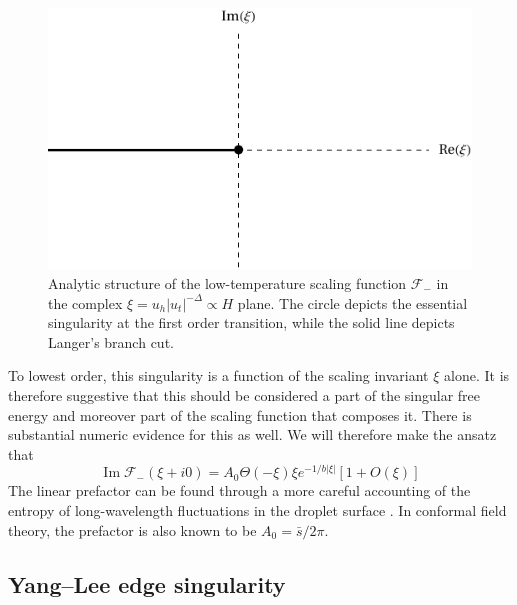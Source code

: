 \documentclass[
aps,
pre,
preprint,
longbibliography,
floatfix
]{revtex4-2}
\begin{document}
\begin{figure}
  \includegraphics{figs/F_lower_singularities.pdf}
  \caption{
    Analytic structure of the low-temperature scaling function $\mathcal F_-$
    in the complex $\xi=u_h|u_t|^{-\Delta}\propto H$ plane. The circle
    depicts the essential singularity at the first order transition, while the
    solid line depicts Langer's branch cut.
  } \label{fig:lower.singularities}
\end{figure}

To lowest order, this singularity is a function of the scaling invariant $\xi$
alone. It is therefore suggestive that this should be considered a part of the
singular free energy and moreover part of the scaling function that composes
it. There is substantial numeric evidence for this as well. We will therefore
make the ansatz that
\begin{equation} \label{eq:essential.singularity}
  \operatorname{Im}\mathcal F_-(\xi+i0)=A_0\Theta(-\xi)\xi e^{-1/b|\xi|}\left[1+O(\xi)\right]
\end{equation}
\cite{Houghton_1980_The}
The linear prefactor can be found through a more careful accounting of the
entropy of long-wavelength fluctuations in the droplet surface
\cite{Gunther_1980_Goldstone}. In conformal field theory, the prefactor is also known to be $A_0=\bar s/2\pi$.

\subsection{Yang--Lee edge singularity}
\end{document}
